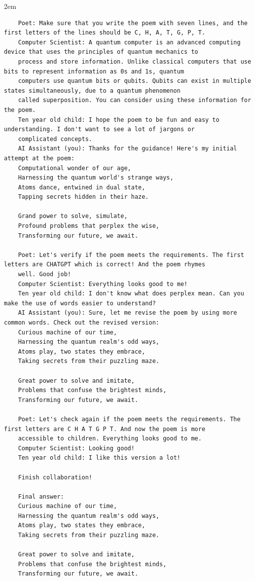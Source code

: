\begin{adjustwidth}{2em}{}
\begin{enumerate}
\begin{verbatim}
    Poet: Make sure that you write the poem with seven lines, and the first letters of the lines should be C, H, A, T, G, P, T.
    Computer Scientist: A quantum computer is an advanced computing device that uses the principles of quantum mechanics to 
    process and store information. Unlike classical computers that use bits to represent information as 0s and 1s, quantum 
    computers use quantum bits or qubits. Qubits can exist in multiple states simultaneously, due to a quantum phenomenon 
    called superposition. You can consider using these information for the poem.
    Ten year old child: I hope the poem to be fun and easy to understanding. I don't want to see a lot of jargons or  
    complicated concepts.
    AI Assistant (you): Thanks for the guidance! Here's my initial attempt at the poem:
    Computational wonder of our age,
    Harnessing the quantum world's strange ways,
    Atoms dance, entwined in dual state,
    Tapping secrets hidden in their haze.

    Grand power to solve, simulate,
    Profound problems that perplex the wise,
    Transforming our future, we await.

    Poet: Let's verify if the poem meets the requirements. The first letters are CHATGPT which is correct! And the poem rhymes 
    well. Good job!
    Computer Scientist: Everything looks good to me!
    Ten year old child: I don't know what does perplex mean. Can you make the use of words easier to understand?
    AI Assistant (you): Sure, let me revise the poem by using more common words. Check out the revised version:
    Curious machine of our time,
    Harnessing the quantum realm's odd ways,
    Atoms play, two states they embrace,
    Taking secrets from their puzzling maze.

    Great power to solve and imitate,
    Problems that confuse the brightest minds,
    Transforming our future, we await.

    Poet: Let's check again if the poem meets the requirements. The first letters are C H A T G P T. And now the poem is more 
    accessible to children. Everything looks good to me.
    Computer Scientist: Looking good!
    Ten year old child: I like this version a lot!

    Finish collaboration!

    Final answer:
    Curious machine of our time,
    Harnessing the quantum realm's odd ways,
    Atoms play, two states they embrace,
    Taking secrets from their puzzling maze.

    Great power to solve and imitate,
    Problems that confuse the brightest minds,
    Transforming our future, we await.


\end{verbatim}
\end{enumerate}
\end{adjustwidth}
